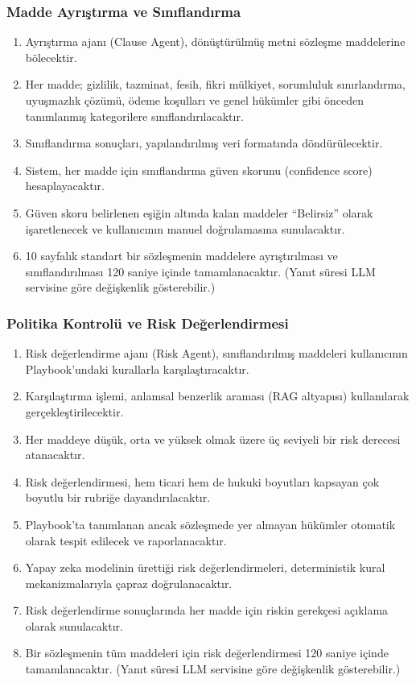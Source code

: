 \documentclass[12pt, a4paper]{article}
\begin{document}
\subsubsection{Madde Ayrıştırma ve Sınıflandırma}
\begin{enumerate}[leftmargin=2cm]
    \item Ayrıştırma ajanı (Clause Agent), dönüştürülmüş metni sözleşme maddelerine bölecektir.
    \item Her madde; gizlilik, tazminat, fesih, fikri mülkiyet, sorumluluk sınırlandırma, uyuşmazlık çözümü, ödeme koşulları ve genel hükümler gibi önceden tanımlanmış kategorilere sınıflandırılacaktır.
    \item Sınıflandırma sonuçları, yapılandırılmış veri formatında döndürülecektir.
    \item Sistem, her madde için sınıflandırma güven skorunu (confidence score) hesaplayacaktır.
    \item Güven skoru belirlenen eşiğin altında kalan maddeler ``Belirsiz'' olarak işaretlenecek ve kullanıcının manuel doğrulamasına sunulacaktır.
    \item 10 sayfalık standart bir sözleşmenin maddelere ayrıştırılması ve sınıflandırılması 120 saniye içinde tamamlanacaktır. (Yanıt süresi LLM servisine göre değişkenlik gösterebilir.)
\end{enumerate}

\subsubsection{Politika Kontrolü ve Risk Değerlendirmesi}
\begin{enumerate}[leftmargin=2cm]
    \item Risk değerlendirme ajanı (Risk Agent), sınıflandırılmış maddeleri kullanıcının Playbook'undaki kurallarla karşılaştıracaktır.
    \item Karşılaştırma işlemi, anlamsal benzerlik araması (RAG altyapısı) kullanılarak gerçekleştirilecektir.
    \item Her maddeye düşük, orta ve yüksek olmak üzere üç seviyeli bir risk derecesi atanacaktır.
    \item Risk değerlendirmesi, hem ticari hem de hukuki boyutları kapsayan çok boyutlu bir rubriğe dayandırılacaktır.
    \item Playbook'ta tanımlanan ancak sözleşmede yer almayan hükümler otomatik olarak tespit edilecek ve raporlanacaktır.
    \item Yapay zeka modelinin ürettiği risk değerlendirmeleri, deterministik kural mekanizmalarıyla çapraz doğrulanacaktır.
    \item Risk değerlendirme sonuçlarında her madde için riskin gerekçesi açıklama olarak sunulacaktır.
    \item Bir sözleşmenin tüm maddeleri için risk değerlendirmesi 120 saniye içinde tamamlanacaktır. (Yanıt süresi LLM servisine göre değişkenlik gösterebilir.)
\end{enumerate}
\end{document}
